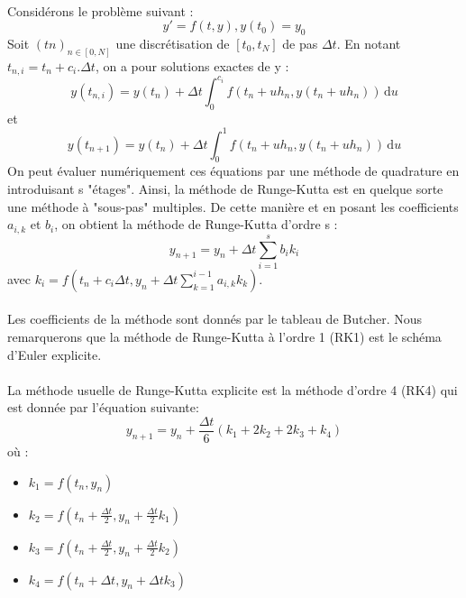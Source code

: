         \paragraph{}
        Considérons le problème suivant :
        \begin{equation}
            y' = f(t, y),    y(t_0) = y_0
        \end{equation}
        Soit $(tn)_{n \in [0, N]}$ une discrétisation de $[t_0, t_N]$ de pas $\Delta t$. En notant $t_{n,i} = t_n + c_i . \Delta t$, on a pour solutions exactes de y :
        \begin{equation}
            y(t_{n,i}) = y(t_n) + \Delta t \int_{0}^{c_i} f(t_n + uh_n, y(t_n + uh_n)) \, \mathrm{d}u
        \end{equation}
        et
        \begin{equation}
            y(t_{n + 1}) = y(t_n) + \Delta t \int_{0}^{1} f(t_n + uh_n, y(t_n + uh_n)) \, \mathrm{d}u
        \end{equation}
        On peut évaluer numériquement ces équations par une méthode de quadrature en introduisant s "étages". Ainsi, la méthode de Runge-Kutta est en quelque sorte une méthode à "sous-pas" multiples. De cette manière et en posant les coefficients $a_{i, k}$ et $b_i$,  on obtient la méthode de Runge-Kutta d'ordre s :
        \begin{equation}
            y_{n+1} = y_n + \Delta t \sum_{i=1}^{s} b_ik_i
        \end{equation}
        avec $k_i = f(t_n + c_i\Delta t, y_n + \Delta t \sum_{k=1}^{i-1} a_{i,k}k_k)$.

        \paragraph{}
        Les coefficients de la méthode sont donnés par le tableau de Butcher. Nous remarquerons que la méthode de Runge-Kutta à l'ordre 1 (RK1) est le schéma d'Euler explicite.

        \paragraph{}
        La méthode usuelle de Runge-Kutta explicite est la méthode d'ordre 4 (RK4) qui est donnée par l'équation suivante:
        \begin{equation}
            y_{n+1} = y_n + \frac{\Delta t}{6}(k_1 + 2k_2 + 2k_3 + k_4)
        \end{equation}
        où :
        \begin{itemize}
            \item $k_1 = f(t_n, y_n)$
            \item $k_2 = f(t_n + \frac{\Delta t}{2}, y_n + \frac{\Delta t}{2}k_1)$
            \item $k_3 = f(t_n + \frac{\Delta t}{2}, y_n + \frac{\Delta t}{2}k_2)$
            \item $k_4 = f(t_n + \Delta t, y_n + \Delta tk_3)$
        \end{itemize}

